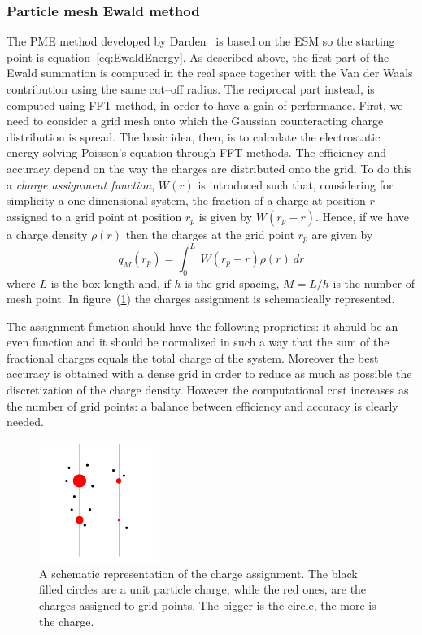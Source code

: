 \subsubsection{Particle mesh Ewald method}
The \acf{PME} method developed by Darden \etal\, \cite{DardenPME} is based on the \ac{ESM} so the starting point
is equation~\eqref{eq:EwaldEnergy}. As described above, the first part of the Ewald summation is computed in the
real space together with the Van der Waals contribution using the same cut--off radius. The reciprocal part
instead, is computed using \ac{FFT} method, in order to have a gain of performance. First, we need to
consider a grid mesh onto which the Gaussian counteracting charge distribution is spread. The basic idea, then,
is to calculate the electrostatic energy solving Poisson's equation through \ac{FFT} methods. The efficiency and
accuracy depend on the way the charges are distributed onto the grid. To do this a \textit{charge assignment
function}, $W(r)$ is introduced such that, considering for simplicity a one dimensional system, the fraction of a
charge at position $r$ assigned to a grid point at position $r_p$ is given by $W(r_p - r)$. Hence, if we have a
charge density $\rho(r)$ then the charges at the grid point $r_p$ are given by
\begin{equation}
	q_M(r_p) = \int_0^L\ W(r_p - r) \rho (r)\ dr
	\label{eq:meshAssign}
\end{equation}
where $L$ is the box length and, if $h$ is the grid spacing, $M = L/h$ is the number of mesh point. In
figure~(\ref{fig:gidAssign}) the charges assignment is schematically represented.

The assignment function should have the following proprieties: it should be an even function and it should be
normalized in such a way that the sum of the fractional charges equals the total charge of the system. Moreover
the best accuracy is obtained with a dense grid in order to reduce as much as possible the discretization of the
charge density. However the computational cost increases as the number of grid points: a balance between
efficiency and accuracy is clearly needed.
\begin{figure}
	\includegraphics[width=0.35\textwidth]{./img/gridCharge/gridCharge}
	\caption{A schematic representation of the charge assignment. The black filled circles are a unit particle charge, while the red ones, are the charges assigned to grid points. The bigger is the circle, the more is the charge.}
	\label{fig:gidAssign}
\end{figure}

